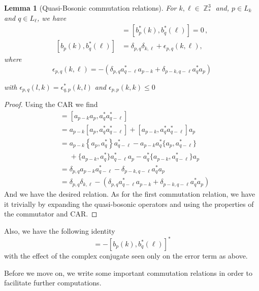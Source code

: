 \documentclass[sn-mathphys, Numbered ,a4paper]{sn-jnl}%
\DeclareMathOperator{\Z}{\mathbb{Z}}
\theoremstyle{plain}
\newtheorem{lemma}[theorem]{Lemma}
\theoremstyle{definition}
\theoremstyle{remark}
\theoremstyle{plain}
\theoremstyle{definition}
\theoremstyle{remark}
\begin{document}
\begin{lemma}[Quasi-Bosonic commutation relations]\label{lem:paircomm}
For $k,\ell \in \Z^3_*$ and, $p \in L_{k}$ and $q\in L_{\ell}$, we have
   \begin{align}
       [b_{p}(k),b_{q}(\ell)] &= [b^*_{p}(k),b^*_{q}(\ell)] = 0\,,\\
       [b_{p}(k),b^*_{q}(\ell)] &= \delta_{p,q}\delta_{k,\ell} + \epsilon_{p,q}(k,\ell),
   \end{align} where
   \begin{equation}
       \epsilon_{p,q}(k,\ell) = -\left(\delta_{p,q}a^*_{q-\ell}a_{p-k} + \delta_{p-k,q-\ell}a^*_{q}a_{p}\right)
   \end{equation}

   
   with $\epsilon_{p,q}(l,k) = \epsilon^*_{q,p}(k,l) $ and $\epsilon_{p,p}(k,k)\leq 0$ \end{lemma}
\begin{proof} Using the CAR we find
    \begin{align}
        [b_{p}(k),b^*_{q}(\ell)] &= [a_{p-k}a_{p},a^*_{q}a^*_{q-\ell}]\nonumber\\
        &= a_{p-k}[a_p,a^*_{q}a^*_{q-\ell}] + [a_{p-k},a^*_{q}a^*_{q-\ell}]a_{p}\nonumber\\
        &= a_{p-k}\left\{a_p,a^*_{q}\right\}a^*_{q-\ell} - a_{p-k}a^*_{q}\{a_{p},a^*_{q-\ell}\}\nonumber \\ &\phantom{=}+ \{a_{p-k},a^*_q\}a^*_{q-\ell}a_{p} - a^*_{q}\{a_{p-k},a^*_{q-\ell}\}a_{p}\nonumber\\
        &=\delta_{p,q}a_{p-k}a^*_{q-\ell} - \delta_{p-k,q-\ell}a^*_{q}a_{p}\nonumber\\
        &= \delta_{p,q}\delta_{k,\ell}-\left(\delta_{p,q}a^*_{q-\ell}a_{p-k} + \delta_{p-k,q-\ell}a^*_{q}a_{p}\right)
    \end{align}
And we have the desired relation. As for the first commutation relation, we have it trivially by expanding the quasi-bosonic operators and using the properties of the commutator and CAR.
\end{proof}
Also, we have the following identity
\begin{equation}
    [b^*_p(k), b_q(\ell)] = -[b_{p}(k),b^*_{q}(\ell)]^*
\end{equation}
with the effect of the complex conjugate seen only on the error term as above.  

Before we move on, we write some important commutation relations in order to facilitate further computations.\newline
\end{document}
